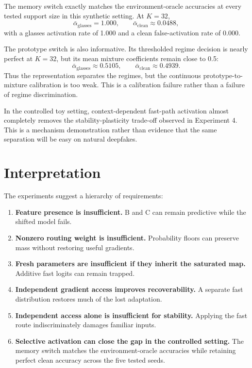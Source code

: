 \documentclass[10pt]{article}
\begin{document}
The memory switch exactly matches the environment-oracle accuracies at every tested support size in this synthetic setting. At $K=32$,
\[
\bar{\alpha}_{\mathrm{glasses}}=1.000,
\qquad
\bar{\alpha}_{\mathrm{clean}}\approx0.0488,
\]
with a glasses activation rate of 1.000 and a clean false-activation rate of 0.000.

The prototype switch is also informative. Its thresholded regime decision is nearly perfect at $K=32$, but its mean mixture coefficients remain close to 0.5:
\[
\bar{\alpha}_{\mathrm{glasses}}\approx0.5105,
\qquad
\bar{\alpha}_{\mathrm{clean}}\approx0.4939.
\]
Thus the representation separates the regimes, but the continuous prototype-to-mixture calibration is too weak. This is a calibration failure rather than a failure of regime discrimination.

In the controlled toy setting, context-dependent fast-path activation almost completely removes the stability-plasticity trade-off observed in Experiment 4. This is a mechanism demonstration rather than evidence that the same separation will be easy on natural deepfakes.

\section{Interpretation}

The experiments suggest a hierarchy of requirements:
\begin{enumerate}[leftmargin=*]
    \item \textbf{Feature presence is insufficient.} B and C can remain predictive while the shifted model fails.
    \item \textbf{Nonzero routing weight is insufficient.} Probability floors can preserve mass without restoring useful gradients.
    \item \textbf{Fresh parameters are insufficient if they inherit the saturated map.} Additive fast logits can remain trapped.
    \item \textbf{Independent gradient access improves recoverability.} A separate fast distribution restores much of the lost adaptation.
    \item \textbf{Independent access alone is insufficient for stability.} Applying the fast route indiscriminately damages familiar inputs.
    \item \textbf{Selective activation can close the gap in the controlled setting.} The memory switch matches the environment-oracle accuracies while retaining perfect clean accuracy across the five tested seeds.
\end{enumerate}
\end{document}
